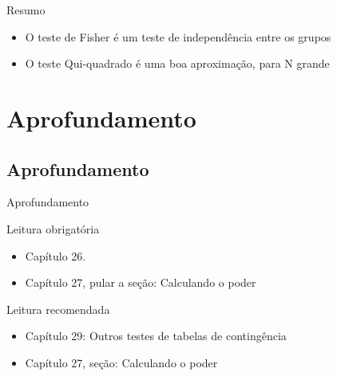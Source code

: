\documentclass{beamer}
\begin{document}
\begin{frame}{\scriptsize Resumo}
  \begin{itemize}
    \footnotesize
  \item O teste de Fisher é um teste de independência entre os grupos
    \bigskip
  \item O teste Qui-quadrado é uma boa aproximação, para N grande
  \end{itemize}
\end{frame}

\section{Aprofundamento}

\subsection{Aprofundamento}

\begin{frame}{\scriptsize Aprofundamento}
  \begin{block}{Leitura obrigatória}
    \begin{itemize}
      \footnotesize
    \item Capítulo 26.
    \item Capítulo 27, pular a seção: Calculando o poder
    \end{itemize}
  \end{block}
  \begin{block}{Leitura recomendada}
    \begin{itemize}
      \scriptsize
    \item Capítulo 29: Outros testes de tabelas de contingência
    \item Capítulo 27, seção: Calculando o poder
    \end{itemize}
  \end{block}
\end{frame}
\end{document}
